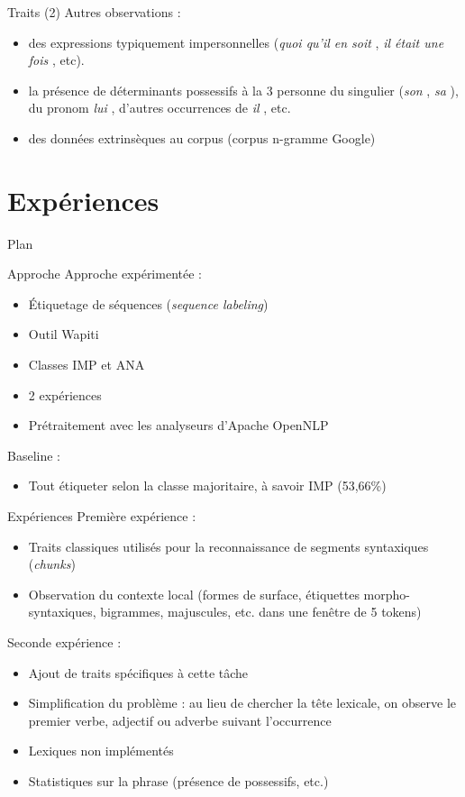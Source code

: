 \documentclass{beamer}
\begin{document}
\begin{frame}{Traits (2)}
Autres observations :
\begin{itemize}
  \item des expressions typiquement impersonnelles (\og \textit{quoi qu'il en soit} \fg{}, \og{} \textit{il était une fois} \fg{}, etc).
  \item la présence de déterminants possessifs à la 3 personne du singulier (\og \textit{son} \fg{}, \og \textit{sa} \fg{}), du pronom \og \textit{lui} \fg{} , d'autres occurrences de \og \textit{il} \fg{}, etc.
  \item des données extrinsèques au corpus (corpus n-gramme Google)
\end{itemize}
\end{frame}


\section{Expériences}

\begin{frame}{Plan}
  \tableofcontents[currentsection]
\end{frame}

\begin{frame}{Approche}
Approche expérimentée :
\begin{itemize}
  \item Étiquetage de séquences (\textit{sequence labeling})
  \item Outil Wapiti
  \item Classes IMP et ANA
  \item 2 expériences
  \item Prétraitement avec les analyseurs d'Apache OpenNLP
\end{itemize}
\vskip 1cm
Baseline :
\begin{itemize}
  \item Tout étiqueter selon la classe majoritaire, à savoir IMP (53,66\%)
\end{itemize}
\end{frame}

\begin{frame}{Expériences}
Première expérience :
\begin{itemize}
  \item Traits classiques utilisés pour la reconnaissance de segments syntaxiques (\textit{chunks})
  \item Observation du contexte local (formes de surface, étiquettes morpho-syntaxiques, bigrammes, majuscules, etc. dans une fenêtre de 5 tokens)
\end{itemize}
\vskip 0.5cm
Seconde expérience :
\begin{itemize}
  \item Ajout de traits spécifiques à cette tâche
  \item Simplification du problème : au lieu de chercher la tête lexicale, on observe le premier verbe, adjectif ou adverbe suivant l'occurrence
  \item Lexiques non implémentés
  \item Statistiques sur la phrase (présence de possessifs, etc.)
\end{itemize}
\end{frame}
\end{document}
